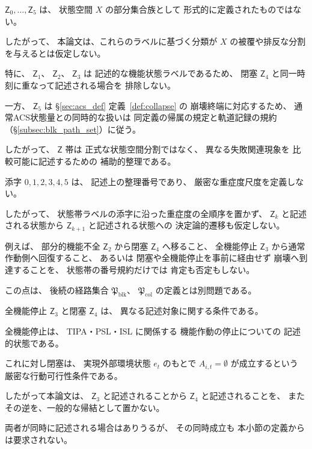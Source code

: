 \begin{remark}
\label{rem:Z_not_partition}
$\mathsf{Z}_0,\ldots,\mathsf{Z}_5$ は、
状態空間 $X$ の部分集合族として
形式的に定義されたものではない。

したがって、
本論文は、これらのラベルに基づく分類が
$X$ の被覆や排反な分割を与えるとは仮定しない。

特に、
$\mathsf{Z}_1$、
$\mathsf{Z}_2$、
$\mathsf{Z}_3$ は
記述的な機能状態ラベルであるため、
閉塞
$\mathsf{Z}_4$
と同一時刻に重なって記述される場合を
排除しない。

一方、
$\mathsf{Z}_5$ は
\S\ref{sec:acs_def} 定義~\ref{def:collapse} の
崩壊終端に対応するため、
通常ACS状態量との同時的な扱いは
同定義の帰属の規定と軌道記録の規約（\S\ref{subsec:blk_path_set}）に従う。

したがって、
$\mathsf{Z}$ 帯は
正式な状態空間分割ではなく、
異なる失敗関連現象を
比較可能に記述するための
補助的整理である。
\end{remark}

\begin{remark}
\label{rem:Z_not_total_order}
添字
$0,1,2,3,4,5$
は、
記述上の整理番号であり、
厳密な重症度尺度を定義しない。

したがって、
状態帯ラベルの添字に沿った重症度の全順序を置かず、
$\mathsf{Z}_k$ と記述される状態から
$\mathsf{Z}_{k+1}$ と記述される状態への
決定論的遷移も仮定しない。

例えば、
部分的機能不全
$\mathsf{Z}_2$
から閉塞
$\mathsf{Z}_4$
へ移ること、
全機能停止
$\mathsf{Z}_3$
から通常作動側へ回復すること、
あるいは
閉塞や全機能停止を事前に経由せず
崩壊へ到達することを、
状態帯の番号規約だけでは
肯定も否定もしない。

この点は、
後続の経路集合
$\mathfrak{P}_{\mathrm{blk}}$、
$\mathfrak{P}_{\mathrm{col}}$
の定義とは別問題である。
\end{remark}

\begin{remark}[全機能停止と閉塞の非同一性]
\label{rem:full_stop_not_blockage}
全機能停止
$\mathsf{Z}_3$
と閉塞
$\mathsf{Z}_4$
は、
異なる記述対象に関する条件である。

全機能停止は、
TIPA・PSL・ISL に関係する
機能作動の停止についての
記述的状態である。

これに対し閉塞は、
実現外部環境状態 $e_t$ のもとで
$A_{i,t}=\emptyset$
が成立するという
厳密な行動可行性条件である。

したがって本論文は、
$\mathsf{Z}_3$ と記述されることから
$\mathsf{Z}_4$ と記述されることを、
またその逆を、一般的な帰結として置かない。

両者が同時に記述される場合はありうるが、
その同時成立も
本小節の定義からは要求されない。
\end{remark}

